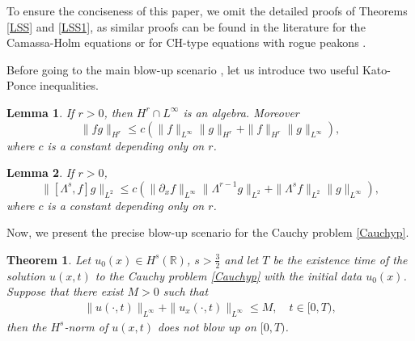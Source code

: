 \documentclass[11pt]{article}
\newtheorem{theorem}{Theorem}
\newtheorem{lemma}{Lemma}
\begin{document}
To ensure the conciseness of this paper, we omit the detailed proofs of Theorems \ref{LSS} and \ref{LSS1}, as similar proofs can be found in the literature for the Camassa-Holm equations \cite{Dan2001,Dan2003} or for CH-type equations with rogue peakons \cite{zhu2023rogue}.

Before going to the main blow-up scenario \cite{chen2010blowup}, let us introduce two useful Kato-Ponce inequalities.
\begin{lemma}\emph{\cite{KP1988CPAM}}
If $r>0$, then $H^r\cap L^\infty$ is an algebra. Moreover
\begin{equation}\label{KP1}
\|fg\|_{H^r}\leq c(\|f\|_{L^\infty}\|g\|_{H^r}+\|f\|_{H^r}\|g\|_{L^\infty}),
\end{equation}
where $c$ is a constant depending only on $r$.
\end{lemma}
\begin{lemma}\emph{\cite{KP1988CPAM}}
If $r>0$, 
\begin{equation}\label{KP2}
\|[\Lambda^s,f]g\|_{L^2}\leq c(\|\partial_xf\|_{L^\infty}\|\Lambda^{r-1}g\|_{L^2}
+\|\Lambda^sf\|_{L^2}\|g\|_{L^\infty}),
\end{equation}
where $c$ is a constant depending only on $r$.
\end{lemma}
Now, we present the precise blow-up scenario for the Cauchy problem \eqref{Cauchyp}.
\begin{theorem}\label{bls1}
Let $u_0(x)\in H^s(\mathbb{R})$, $s>\frac{3}{2}$ and let $T$ be the existence time of the solution $u(x,t)$ to  the Cauchy problem \eqref{Cauchyp} with the initial data $u_0(x)$. Suppose that there exist $M > 0$ such that
\begin{eqnarray}\label{blsc}
\|u(\cdot,t)\|_{L^\infty}+\|u_x(\cdot,t)\|_{L^\infty}\leq M, \quad t\in [0,T),
\end{eqnarray}
then the $H^s$-norm of $u(x,t)$ does not blow up on $[0,T)$.
\end{theorem}
\end{document}
